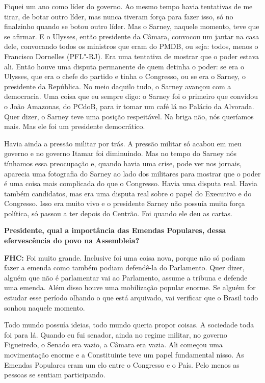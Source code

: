 Fiquei um ano como líder do governo. Ao mesmo tempo havia tentativas de
me tirar, de botar outro líder, mas nunca tiveram força para fazer isso,
só no finalzinho quando se botou outro líder. Mas o Sarney, naquele
momento, teve que se afirmar. E o Ulysses, então presidente da Câmara,
convocou um jantar na casa dele, convocando todos os ministros que eram
do PMDB, ou seja: todos, menos o Francisco Dornelles (PFL"-RJ). Era uma
tentativa de mostrar que o poder estava ali. Então houve uma disputa
permanente de quem detinha o poder: se era o Ulysses, que era o chefe do
partido e tinha o Congresso, ou se era o Sarney, o presidente da
República. No meio daquilo tudo, o Sarney avançou com a democracia. Uma
coisa que eu sempre digo: o Sarney foi o primeiro que convidou o João
Amazonas, do PCdoB, para ir tomar um café lá no Palácio da Alvorada.
Quer dizer, o Sarney teve uma posição respeitável. Na briga não, nós
queríamos mais. Mas ele foi um presidente democrático.

Havia ainda a pressão militar por trás. A pressão militar só acabou em
meu governo e no governo Itamar foi diminuindo. Mas no tempo do Sarney
nós tínhamos essa preocupação e, quando havia uma crise, pode ver nos
jornais, aparecia uma fotografia do Sarney ao lado dos militares para
mostrar que o poder é uma coisa mais complicada do que o Congresso.
Havia uma disputa real. Havia também candidatos, mas era uma disputa
real sobre o papel do Executivo e do Congresso. Isso era muito vivo e o
presidente Sarney não possuía muita força política, só passou a ter
depois do Centrão. Foi quando ele deu as cartas.

\textbf{Presidente, qual a importância das Emendas Populares, dessa
efervescência do povo na Assembleia? }

\textbf{FHC:} Foi muito grande. Inclusive foi uma coisa nova, porque não
só podiam fazer a emenda como também podiam defendê-la do Parlamento.
Quer dizer, alguém que não é parlamentar vai ao Parlamento, assume a
tribuna e defende uma emenda. Além disso houve uma mobilização popular
enorme. Se alguém for estudar esse período olhando o que está arquivado,
vai verificar que o Brasil todo sonhou naquele momento.

Todo mundo possuía ideias, todo mundo queria propor coisas. A sociedade
toda foi para lá. Quando eu fui senador, ainda no regime militar, no
governo Figueiredo, o Senado era vazio, a Câmara era vazia. Ali começou
uma movimentação enorme e a Constituinte teve um papel fundamental
nisso. As Emendas Populares eram um elo entre o Congresso e o País. Pelo
menos as pessoas se sentiam participando.

